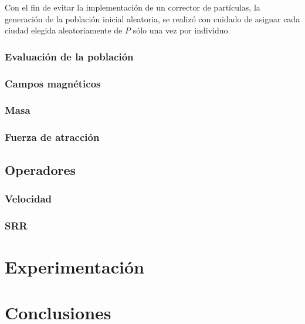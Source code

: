 \documentclass[12pt]{article}
\begin{document}
Con el fin de evitar la implementación de un corrector de partículas, la generación de la población inicial aleatoria, se realizó con cuidado de asignar cada ciudad elegida aleatoriamente de $P$ sólo una vez por individuo. 
\subsubsection*{Evaluación de la población}

\subsubsection*{Campos magnéticos}
\subsubsection*{Masa}
\subsubsection*{Fuerza de atracción}

\subsection*{Operadores}
\subsubsection*{Velocidad}\label{sec:vel}

\subsubsection*{SRR}
\newpage
\section*{Experimentación}

\section*{Conclusiones}
\end{document}
